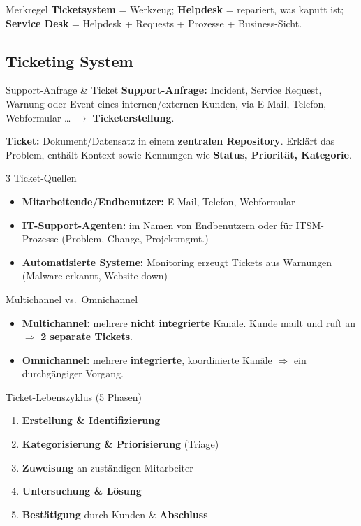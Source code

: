 \documentclass[a4paper, fontsize=7pt]{scrartcl}
\begin{document}
\begin{subbox}{Merkregel}
\textbf{Ticketsystem} = Werkzeug; \textbf{Helpdesk} = repariert, was kaputt ist;
\textbf{Service Desk} = Helpdesk + Requests + Prozesse + Business-Sicht.
\end{subbox}

\subsection{Ticketing System}

\begin{mainbox}{Support-Anfrage \& Ticket}
\textbf{Support-Anfrage:} Incident, Service Request, Warnung oder Event eines
internen/externen Kunden, via E-Mail, Telefon, Webformular \dots{} $\to$
\textbf{Ticketerstellung}.

\textbf{Ticket:} Dokument/Datensatz in einem \textbf{zentralen Repository}.
Erklärt das Problem, enthält Kontext sowie Kennungen wie \textbf{Status,
Priorität, Kategorie}.
\end{mainbox}

\begin{mainbox}{3 Ticket-Quellen}
\begin{itemize}
    \item \textbf{Mitarbeitende/Endbenutzer:} E-Mail, Telefon, Webformular
    \item \textbf{IT-Support-Agenten:} im Namen von Endbenutzern oder für
          ITSM-Prozesse (Problem, Change, Projektmgmt.)
    \item \textbf{Automatisierte Systeme:} Monitoring erzeugt Tickets aus
          Warnungen (Malware erkannt, Website down)
\end{itemize}
\end{mainbox}

\begin{mainbox}{Multichannel vs.\ Omnichannel}
\begin{itemize}
    \item \textbf{Multichannel:} mehrere \textbf{nicht integrierte} Kanäle.
          Kunde mailt und ruft an $\Rightarrow$ \textbf{2 separate Tickets}.
    \item \textbf{Omnichannel:} mehrere \textbf{integrierte}, koordinierte
          Kanäle $\Rightarrow$ ein durchgängiger Vorgang.
\end{itemize}
\end{mainbox}

\begin{mainbox}{Ticket-Lebenszyklus (5 Phasen)}
\begin{enumerate}
    \item \textbf{Erstellung \& Identifizierung}
    \item \textbf{Kategorisierung \& Priorisierung} (Triage)
    \item \textbf{Zuweisung} an zuständigen Mitarbeiter
    \item \textbf{Untersuchung \& Lösung}
    \item \textbf{Bestätigung} durch Kunden \& \textbf{Abschluss}
\end{enumerate}
\end{mainbox}
\end{document}
